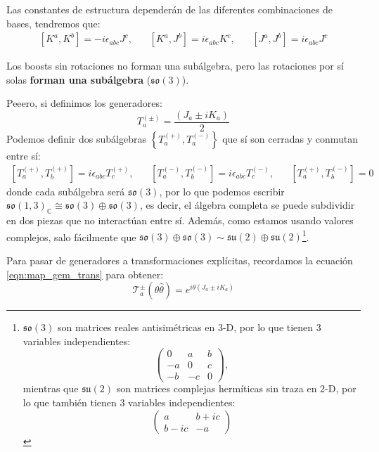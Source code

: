 \documentclass[]{article}
\numberwithin{equation}{section}
\begin{document}
Las constantes de estructura dependerán de las diferentes combinaciones de bases, tendremos que:
\begin{equation}
	\begin{matrix}
		[K^a,K^b] = -i\epsilon_{abc}J^c,\ \ \ \ & [K^a,J^b] = i\epsilon_{abc}K^c,\ \ \ \ & [J^a,J^b] = i\epsilon_{abc}J^c
	\end{matrix}
\end{equation}

Los boosts sin rotaciones no forman una subálgebra, pero las rotaciones por sí solas \textbf{forman una subálgebra} (\(\mathfrak{so}(3)\)).

Peeero, si definimos los generadores:
\begin{equation}
	T^{(\pm)}_a = \frac{(J_a \pm iK_a)}{2}
\end{equation}
Podemos definir dos subálgebras \(\left\lbrace T^{(+)}_a,T^{(-)}_a\right\rbrace\) que sí son cerradas y conmutan entre sí:
\begin{equation}
	\begin{matrix}
		[T^{(+)}_a,T^{(+)}_b] = i\epsilon_{abc}T^{(+)}_c,\ \ \ \ & [T^{(-)}_a,T^{(-)}_b] = i\epsilon_{abc}T^{(-)}_c,\ \ \ \ & [T^{(+)}_a,T^{(-)}_b] = 0
	\end{matrix}
\end{equation}
donde cada subálgebra será \(\mathfrak{so}(3)\), por lo que podemos escribir \(\mathfrak{so}(1,3)_\mathbb{C}\cong\mathfrak{so}(3)\oplus\mathfrak{so}(3)\), es decir, el álgebra completa se puede subdividir en dos piezas que no interactúan entre sí. Además, como estamos usando valores  complejos, salo fácilmente que \(\mathfrak{so}(3)\oplus\mathfrak{so}(3) \sim \mathfrak{su}(2)\oplus\mathfrak{su}(2)\)\footnote{\(\mathfrak{so}(3)\) son matrices reales antisimétricas en 3-D, por lo que tienen 3 variables independientes:
\[\begin{pmatrix}
	0 & a & b\\
	-a & 0 & c\\
	-b & -c & 0
\end{pmatrix},\]mientras que \(\mathfrak{su}(2)\) son matrices complejas hermíticas sin traza en 2-D, por lo que también tienen 3 variables independientes:
\[\begin{pmatrix}
a & b+ic\\
b-ic & -a
\end{pmatrix}\]}.

Para pasar de generadores a transformaciones explícitas, recordamos la ecuación \ref{eqn:map_gem_trans} para obtener:
\begin{equation}
	\mathcal{T}_a^\pm (\theta\hat{\theta}) = e^{i\theta(J_a \pm iK_a)}
\end{equation}
\end{document}
